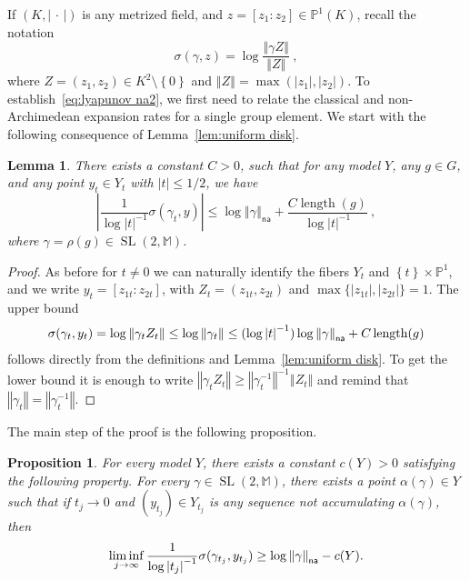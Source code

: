 \documentclass[11pt]{article}
\newtheorem{lemm}[theo]{Lemma}
\newtheorem{prop}[theo]{Proposition}
\theoremstyle{definition}
\numberwithin{equation}{section}
\numberwithin{figure}{section}
\numberwithin{table}{section}
\DeclareMathOperator{\length}{length}
\DeclareMathOperator{\SL}{SL}
\newcommand{\mm}{\mathbb{M}}
\newcommand{\cv}{\rightarrow}
\newcommand{\set}[1]{\left\{#1\right\}}
\newcommand{\norm}[1]{\left\Vert#1\right\Vert}
\newcommand{\abs}[1]{\left\vert#1\right\vert}
\newcommand{\pu}{{\mathbb{P}^1}}
\newcommand{\PP}{\mathbb{P}}
\newcommand{\unsur}[1]{\frac{1}{#1}}
\newcommand{\na}{\mathsf{na}}
\newcommand{\inv}{^{-1}}
\begin{document}
If $(K, \abs{{\,\cdot\,}})$ is any metrized field, and $z =[z_1:z_2]\in \PP^1(K)$, recall the notation
\[
\sigma(\gamma, z) = \log \frac{\norm{\gamma Z}}{\norm{Z}}~,
\]
where $Z=(z_1, z_2)\in K^2\setminus\set{0}$ and $\norm{Z} = \max(\abs{z_1}, \abs{z_2})$. To establish~\eqref{eq:lyapunov na2}, we first need to relate the classical and non-Archimedean expansion rates for a single group element. We start with the following consequence of Lemma~\ref{lem:uniform disk}.

\begin{lemm}\label{lem:sup2}
There exists a constant $C>0$, such that for any model $Y$, any $g\in G$, and any point $y_{t}\in Y_{t}$ with $|t|\le 1/2$, we have
\begin{equation}\label{eq:sup2}
\abs{\frac{1}{\log|t|^{-1}} \sigma(\gamma_t, y)}
\leq
\log \norm{\gamma}_\na + \frac{C \length (g)}{\log\abs{t}\inv}~,
\end{equation}
where $\gamma = \rho(g) \in \SL(2,\mm)$.
\end{lemm}

\begin{proof}
As before for $t\neq 0$ we can naturally identify the fibers $Y_t$ and $\set{t}\times \pu$, and we write $y_t = [z_{1t}:z_{2t}]$, with $Z_t = (z_{1t}, z_{2t})$ and $\max\{ |z_{1t}|, |z_{2t}|\} =1$. The upper bound
\[
\sigma(\gamma_t, y_{t}) = \log\norm{\gamma_t Z_t} \leq \log\norm{\gamma_t} \le
(\log\abs{t}\inv) \log\norm{\gamma}_{\sf na} + C \length (g)
\]
follows directly from the definitions and Lemma~\ref{lem:uniform disk}. To get the lower bound it is enough to write $ \norm{\gamma_t Z_t} \geq \norm{\gamma_t\inv}\inv \norm{Z_t}$ and remind that $\norm{\gamma_t} = \norm{\gamma_t\inv}$.
\end{proof}

The main step of the proof is the following proposition.

\begin{prop}\label{prop:hybrid}
For every model $Y$, there exists a constant $c(Y)>0$ satisfying the following property. For every $\gamma \in \SL(2, \mm)$, there exists a point $\alpha(\gamma)\in Y$ such that if $t_j\cv0$ and $(y_{t_j})\in Y_{t_j}$ is any sequence not accumulating $\alpha(\gamma)$, then
\begin{equation}\label{eq:norm}
\liminf_{j\cv\infty} \unsur{\log\abs{t_j}\inv} \sigma(\gamma_{t_j}, y_{t_j}) \geq \log\norm{\gamma}_{\sf na} - c(Y).
\end{equation}
\end{prop}
\end{document}
